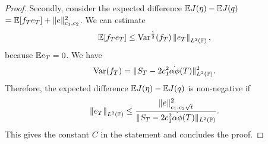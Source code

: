 \documentclass[10pt,a4paper]{article}
\begin{document}
\begin{proof}
Secondly, consider the   expected difference $\Expectation \costFunctional (\eta) - \Expectation \costFunctional (\inventory)$ $=\Expectation[f_\timeHorizon e_\timeHorizon] + \normInventoryTrjectories{e}\squared$. We can estimate
\begin{equation*}
\Expectation[f_\timeHorizon e_\timeHorizon] \leq \Variance^{\half}(f_\timeHorizon)\norm[e_\timeHorizon]_{\Ltwo(\Prob)},
\end{equation*}
because $\Expectation e_\timeHorizon = 0$. We have  
\begin{equation*}
\Variance(f_\timeHorizon)
= \lVert \fundamentalPrice_\timeHorizon - 2\coeffMarketImpact\squared \dot{\alpha\phi} (\timeHorizon) \rVert_{\Ltwo(\Prob)}^{2}. 
\end{equation*} 
Therefore, the   expected difference $\Expectation \costFunctional (\eta) - \Expectation \costFunctional (\inventory)$ is non-negative if 
\begin{equation*}
\norm[e_\timeHorizon]_{\Ltwo(\Prob)} \leq 
\frac{ \lVert e \rVert_{\coeffMarketImpact, \coeffRiskAversion\sqrt{t}} \squared }{\lVert \fundamentalPrice_\timeHorizon - 2\coeffMarketImpact\squared \dot{\alpha\phi} (\timeHorizon) \rVert_{\Ltwo(\Prob)}}.
\end{equation*}
This gives the constant $C$ in the statement and concludes the proof.
%		
%		
%		
%		
%		

\end{proof}
\end{document}
